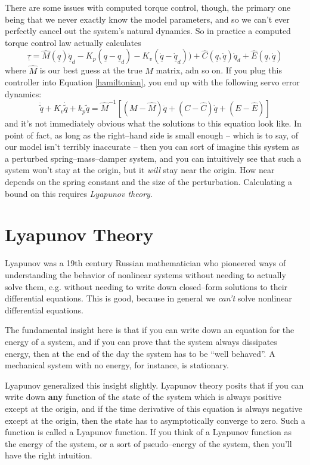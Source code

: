 \documentclass[]{article}
\begin{document}
There are some issues with computed torque control, though, the primary one being that we never exactly know the model parameters, and so we can't ever perfectly cancel out the system's natural dynamics. So in practice a computed torque control law actually calculates
\begin{displaymath}
 \underline{\tau} = \hat{M}(\underline{q}) \ddot{\underline{q}}_{d}- K_{p}(\underline{q} - \underline{q}_{d}) - K_{v}(\underline{\dot{q}} - \underline{\dot{q}}_{d})) + \hat{C}(\underline{q}, \underline{\dot{q}})\dot{q}_{d} + \hat{E}(\underline{q}, \underline{\dot{q}})  
\end{displaymath}
where $\hat{M}$ is our best guess at the true $M$ matrix, adn so on. If you plug this controller into Equation \ref{hamiltonian}, you end up with the following servo error dynamics:
\begin{displaymath}
 \ddot{\tilde{q}} + K_{v}\dot{\tilde{q}} + k_{p}\tilde{q} = \hat{M}^{-1}\left[(M-\hat{M})\ddot{q} + (C-\hat{C})\dot{q} + (E-\hat{E})\right]
\end{displaymath}
and it's not immediately obvious what the solutions to this equation look like. In point of fact, as long as the right--hand side is small enough -- which is to say, of our model isn't terribly inaccurate -- then you can sort of imagine this system as a perturbed spring--mass--damper system, and you can intuitively see that such a system won't stay at the origin, but it \textit{will} stay near the origin. How near depends on the spring constant and the size of the perturbation. Calculating a bound on this requires \textit{Lyapunov theory}.

\section{Lyapunov Theory}
Lyapunov was a 19th century Russian mathematician who pioneered ways of understanding the behavior of nonlinear systems without needing to actually solve them, e.g. without needing to write down closed--form solutions to their differential equations. This is good, because in general we \textit{can't} solve nonlinear differential equations.

The fundamental insight here is that if you can write down an equation for the energy of a system, and if you can prove that the system always dissipates energy, then at the end of the day the system has to be ``well behaved''. A mechanical system with no energy, for instance, is stationary.

Lyapunov generalized this insight slightly. Lyapunov theory posits that if you can write down \textbf{any} function of the state of the system which is always positive except at the origin, and if the time derivative of this equation is always negative except at the origin, then the state has to asymptotically converge to zero. Such a function is called a Lyapunov function. If you think of a Lyapunov function as the energy of the system, or a sort of pseudo--energy of the system, then you'll have the right intuition.
\end{document}
